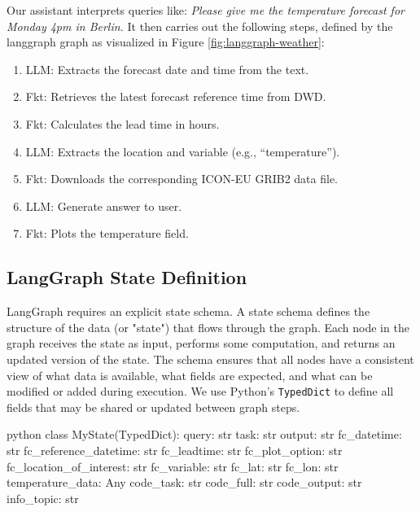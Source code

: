 %
Our assistant interprets queries like:
\textit{Please give me the temperature forecast for Monday 4pm in Berlin.}
It then carries out the following steps, defined by the langgraph graph as visualized in Figure \ref{fig:langgraph-weather}:

\begin{enumerate}
\item LLM: Extracts the forecast date and time from the text.
\item Fkt: Retrieves the latest forecast reference time from DWD.
\item Fkt: Calculates the lead time in hours.
\item LLM: Extracts the location and variable (e.g., ``temperature'').
\item Fkt: Downloads the corresponding ICON-EU GRIB2 data file.
\item LLM: Generate answer to user.
\item Fkt: Plots the temperature field.
\end{enumerate}

%
\subsection*{LangGraph State Definition}

LangGraph requires an explicit state schema. A state schema defines the structure of the data (or "state") that flows through the graph. Each node in the graph receives the state as input, performs some computation, and returns an updated version of the state. The schema ensures that all nodes have a consistent view of what data is available, what fields are expected, and what can be modified or added during execution. We use Python's \texttt{TypedDict} to define all fields that may be shared or updated between graph steps.

\begin{codeonly}{python}
class MyState(TypedDict):
	query: str
	task: str
	output: str
	fc_datetime: str
	fc_reference_datetime: str
	fc_leadtime: str
	fc_plot_option: str
	fc_location_of_interest: str
	fc_variable: str
	fc_lat: str
	fc_lon: str
	temperature_data: Any
	code_task: str
	code_full: str
	code_output: str
	info_topic: str
\end{codeonly}

